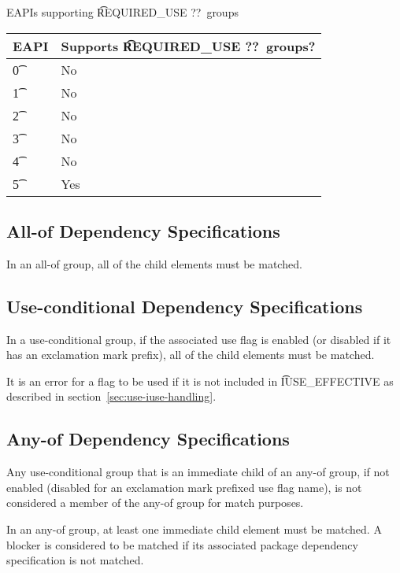 \begin{centertable}{EAPIs supporting \t{REQUIRED\_USE ??}\ groups} \label{tab:at-most-one-of-table}
    \begin{tabular}{ l l }
        \toprule
        \multicolumn{1}{c}{\textbf{EAPI}} &
        \multicolumn{1}{c}{\textbf{Supports \t{REQUIRED\_USE ??}\ groups?}} \\
        \midrule
    \t{0} & No \\
    \t{1} & No \\
    \t{2} & No \\
    \t{3} & No \\
    \t{4} & No \\
    \t{5} & Yes \\
    \bottomrule
    \end{tabular}
\end{centertable}

\subsection{All-of Dependency Specifications}

In an all-of group, all of the child elements must be matched.

\subsection{Use-conditional Dependency Specifications}

In a use-conditional group, if the associated use flag is enabled (or disabled if it has an
exclamation mark prefix), all of the child elements must be matched.

It is an error for a flag to be used if it is not included in \t{IUSE\_EFFECTIVE} as described in
section~\ref{sec:use-iuse-handling}.

\subsection{Any-of Dependency Specifications}

Any use-conditional group that is an immediate child of an any-of group, if not enabled (disabled
for an exclamation mark prefixed use flag name), is not considered a member of the any-of group
for match purposes.

In an any-of group, at least one immediate child element must be matched. A blocker is
considered to be matched if its associated package dependency specification is not matched.

